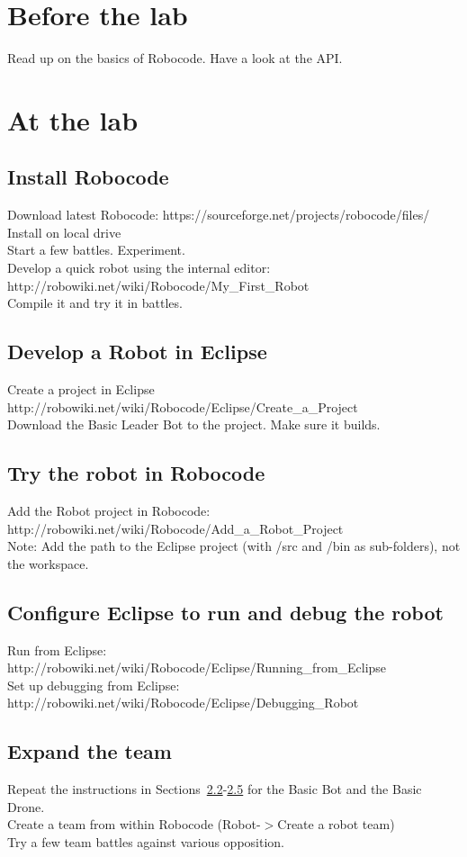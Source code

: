 \documentclass{scrreprt}
\begin{document}
\chapter{Before the lab}
Read up on the basics of Robocode.
Have a look at the API.

\chapter{At the lab}

\section{Install Robocode}
Download latest Robocode: https://sourceforge.net/projects/robocode/files/\\
Install on local drive\\
Start a few battles. Experiment.\\
Develop a quick robot using the internal editor: http://robowiki.net/wiki/Robocode/My_First_Robot\\
Compile it and try it in battles.

\section{Develop a Robot in Eclipse} \label{sec:develop}
Create a project in Eclipse http://robowiki.net/wiki/Robocode/Eclipse/Create_a_Project\\
Download the Basic Leader Bot to the project. Make sure it builds.

\section{Try the robot in Robocode} \label{sec:try}
Add the Robot project in Robocode: http://robowiki.net/wiki/Robocode/Add_a_Robot_Project\\
Note: Add the path to the Eclipse project (with /src and /bin as sub-folders), not the workspace.

\section{Configure Eclipse to run and debug the robot}
Run from Eclipse: http://robowiki.net/wiki/Robocode/Eclipse/Running_from_Eclipse\\
Set up debugging from Eclipse: http://robowiki.net/wiki/Robocode/Eclipse/Debugging_Robot

\section{Expand the team} \label{sec:expand}
Repeat the instructions in Sections~\ref{sec:develop}-\ref{sec:expand} for the Basic Bot and the Basic Drone.\\
Create a team from within Robocode (Robot-$>$Create a robot team)\\
Try a few team battles against various opposition.
\end{document}

